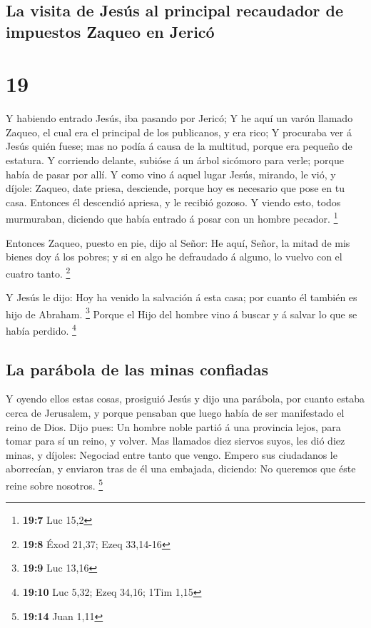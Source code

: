 \hypertarget{la-visita-de-jesuxfas-al-principal-recaudador-de-impuestos-zaqueo-en-jericuxf3}{%
\subsection{La visita de Jesús al principal recaudador de impuestos
Zaqueo en
Jericó}\label{la-visita-de-jesuxfas-al-principal-recaudador-de-impuestos-zaqueo-en-jericuxf3}}

\hypertarget{section-18}{%
\section{19}\label{section-18}}

 Y habiendo entrado Jesús, iba pasando por Jericó;
 Y he aquí un varón llamado Zaqueo, el cual era el
principal de los publicanos, y era rico;  Y procuraba ver
á Jesús quién fuese; mas no podía á causa de la multitud, porque era
pequeño de estatura.  Y corriendo delante, subióse á un
árbol sicómoro para verle; porque había de pasar por allí.
 Y como vino á aquel lugar Jesús, mirando, le vió, y
díjole: Zaqueo, date priesa, desciende, porque hoy es necesario que pose
en tu casa.  Entonces él descendió apriesa, y le recibió
gozoso.  Y viendo esto, todos murmuraban, diciendo que
había entrado á posar con un hombre pecador. \footnote{\textbf{19:7} Luc
  15,2}

 Entonces Zaqueo, puesto en pie, dijo al Señor: He aquí,
Señor, la mitad de mis bienes doy á los pobres; y si en algo he
defraudado á alguno, lo vuelvo con el cuatro tanto. \footnote{\textbf{19:8}
  Éxod 21,37; Ezeq 33,14-16}

 Y Jesús le dijo: Hoy ha venido la salvación á esta casa;
por cuanto él también es hijo de Abraham. \footnote{\textbf{19:9} Luc
  13,16}  Porque el Hijo del hombre vino á buscar y á
salvar lo que se había perdido. \footnote{\textbf{19:10} Luc 5,32; Ezeq
  34,16; 1Tim 1,15}

\hypertarget{la-paruxe1bola-de-las-minas-confiadas}{%
\subsection{La parábola de las minas
confiadas}\label{la-paruxe1bola-de-las-minas-confiadas}}

 Y oyendo ellos estas cosas, prosiguió Jesús y dijo una
parábola, por cuanto estaba cerca de Jerusalem, y porque pensaban que
luego había de ser manifestado el reino de Dios.  Dijo
pues: Un hombre noble partió á una provincia lejos, para tomar para sí
un reino, y volver.  Mas llamados diez siervos suyos, les
dió diez minas, y díjoles: Negociad entre tanto que vengo.
 Empero sus ciudadanos le aborrecían, y enviaron tras de
él una embajada, diciendo: No queremos que éste reine sobre nosotros.
\footnote{\textbf{19:14} Juan 1,11}

